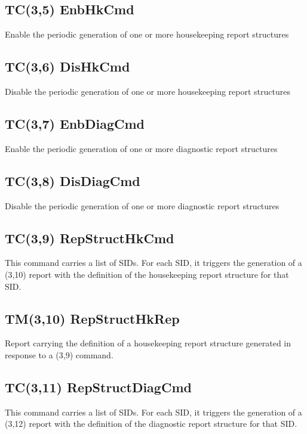 \pagebreak
\subsection{TC(3,5) EnbHkCmd}
Enable the periodic generation of one or more housekeeping report structures

\pagebreak
\subsection{TC(3,6) DisHkCmd}
Disable the periodic generation of one or more housekeeping report structures

\pagebreak
\subsection{TC(3,7) EnbDiagCmd}
Enable the periodic generation of one or more diagnostic report structures

\pagebreak
\subsection{TC(3,8) DisDiagCmd}
Disable the periodic generation of one or more diagnostic report structures

\pagebreak
\subsection{TC(3,9) RepStructHkCmd}
This command carries a list of SIDs. For each SID, it triggers the generation of a (3,10) report with the definition of the housekeeping report structure for that SID.

\pagebreak
\subsection{TM(3,10) RepStructHkRep}
Report carrying the definition of a housekeeping report structure generated in response to a (3,9) command.

\pagebreak
\subsection{TC(3,11) RepStructDiagCmd}
This command carries a list of SIDs. For each SID, it triggers the generation of a (3,12) report with the definition of the diagnostic report structure for that SID.

